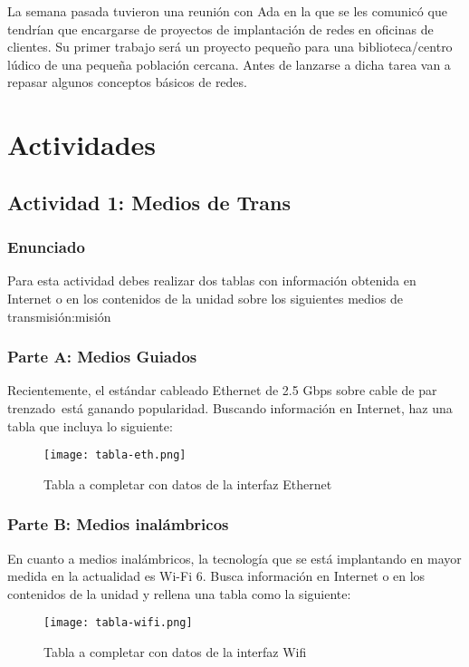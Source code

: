 La semana pasada tuvieron una reunión con Ada en la que se les comunicó que tendrían que encargarse de proyectos de implantación de redes en oficinas de clientes. Su primer trabajo será un proyecto pequeño para una biblioteca/centro lúdico de una pequeña población cercana. Antes de lanzarse a dicha tarea van a repasar algunos conceptos básicos de redes.

\section{Actividades}

\subsection{Actividad 1: Medios de Trans}

\subsubsection{Enunciado}

Para esta actividad debes realizar dos tablas con información obtenida en Internet o en los contenidos de la unidad sobre los siguientes medios de transmisión:misión

\subsubsection*{Parte A: Medios Guiados}
Recientemente, el estándar cableado Ethernet de 2.5 Gbps sobre cable de par trenzado está ganando popularidad. Buscando información en Internet, haz una tabla que incluya lo siguiente:

\begin{figure}[H]
    \centering
    \texttt{[image: tabla-eth.png]}
    \caption{Tabla a completar con datos de la interfaz Ethernet}
\end{figure}

\subsubsection*{Parte B: Medios inalámbricos}
En cuanto a medios inalámbricos, la tecnología que se está implantando en mayor medida en la actualidad es Wi-Fi 6. Busca información en Internet o en los contenidos de la unidad y rellena una tabla como la siguiente:

\begin{figure}[H]
    \centering
    \texttt{[image: tabla-wifi.png]}
    \caption{Tabla a completar con datos de la interfaz Wifi}
\end{figure}

